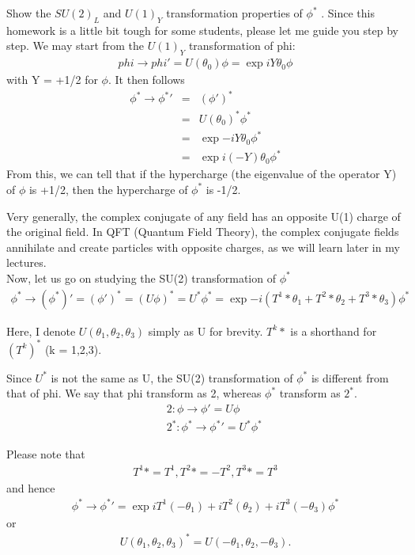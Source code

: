 \documentclass[12pt]{article}
\begin{document}
  Show the $SU(2)_L$ and $U(1)_Y$ transformation properties of
  $\phi^*$ .
  Since this homework is a little bit tough for some students,
  please let me guide you step by step.
  We may start from the $U(1)_Y$ transformation of phi:
  \begin{eqnarray}
  phi \to phi' = U(\theta_0) \phi
              = \exp{ i Y \theta_0 } \phi
  \end{eqnarray}
  with Y = +1/2 for $\phi$.  It then follows
  \begin{eqnarray}
  \phi^* \to \phi^*' &=& (\phi')^*\\
                  &=& U(\theta_0)^* \phi^*\\
                  &=& \exp{ -i Y \theta_0 } \phi^*\\
                  &=& \exp{ i (-Y) \theta_0 } \phi^*
  \end{eqnarray}
  From this, we can tell that if the hypercharge (the eigenvalue of
  the operator Y) of $\phi$ is +1/2, then the hypercharge of $\phi^*$ is
  -1/2.

  Very generally, the complex conjugate of any field has an opposite
  U(1) charge of the original field.
  In QFT (Quantum Field Theory), the complex conjugate fields
  annihilate and create particles with opposite charges, as
  we will learn later in my lectures.\\

  Now, let us go on studying the SU(2) transformation of $\phi^*$
\begin{eqnarray}
  \phi^* \to (\phi^*)'
         = (\phi')^*
         = ( U \phi )^*
         = U^* \phi^*
         = \exp{ -i (T^1* \theta_1 + T^2* \theta_2 + T^3* \theta_3) } \phi^*
\end{eqnarray}
  

  Here, I denote $U(\theta_1,\theta_2,\theta_3)$ simply as U for brevity.
  $T^k*$ is a shorthand for $(T^k)^*$ (k = 1,2,3).

  Since $U^*$ is not the same as U, the SU(2) transformation of $\phi^*$
  is different from that of phi.  We say that phi transform as 2,
  whereas $\phi^*$ transform as $2^*$.\\
\begin{eqnarray}
  &&2:    \phi   \to \phi'   = U   \phi\\
  &&2^*:  \phi^* \to \phi^*' = U^* \phi^*
\end{eqnarray}


  Please note that
\begin{eqnarray}
  T^1* = T^1, T^2* = -T^2, T^3* = T^3
\end{eqnarray}
  and hence
\begin{eqnarray}
  \phi^* \to \phi^*'
         = \exp{ iT^1(-\theta_1) +iT^2(\theta_2) +iT^3(-\theta_3) } \phi^*
\end{eqnarray}
  or
\begin{eqnarray}
  U(\theta_1,\theta_2,\theta_3)^* = U(-\theta_1,\theta_2,-\theta_3).
\end{eqnarray}
\end{document}
